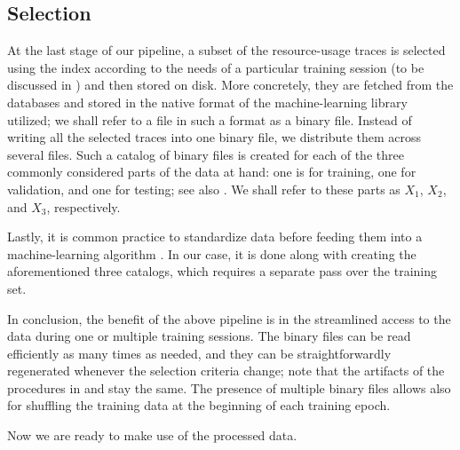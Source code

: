 \subsection{Selection} 
At the last stage of our pipeline, a subset of the resource-usage traces is
selected using the index according to the needs of a particular training session
(to be discussed in ) and then stored on disk. More concretely,
they are fetched from the databases and stored in the native format of the
machine-learning library utilized; we shall refer to a file in such a format as
a binary file. Instead of writing all the selected traces into one binary file,
we distribute them across several files. Such a catalog of binary files is
created for each of the three commonly considered parts \cite{hastie2009} of the
data at hand: one is for training, one for validation, and one for testing; see
also . We shall refer to these parts as $X_1$, $X_2$, and $X_3$,
respectively.

Lastly, it is common practice to standardize data before feeding them into a
machine-learning algorithm \cite{hastie2009}. In our case, it is done along with
creating the aforementioned three catalogs, which requires a separate pass over
the training set.

In conclusion, the benefit of the above pipeline is in the streamlined access to
the data during one or multiple training sessions. The binary files can be read
efficiently as many times as needed, and they can be straightforwardly
regenerated whenever the selection criteria change; note that the artifacts of
the procedures in  and  stay the same. The
presence of multiple binary files allows also for shuffling the training data at
the beginning of each training epoch.

Now we are ready to make use of the processed data.
